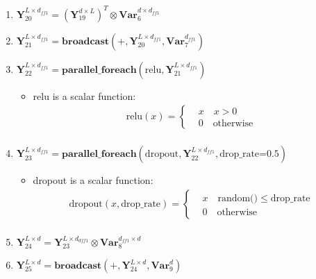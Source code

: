 \begin{enumerate}
  \item $\mathbf{Y}_{20}^{L \times d_{ff1}} = (\mathbf{Y}_{19}^{d \times L})^T \otimes \mathbf{Var}_6^{d \times d_{ff1}}$
  \item $\mathbf{Y}_{21}^{L \times d_{ff1}} = \textbf{broadcast}(+, \mathbf{Y}_{20}^{L \times d_{ff1}}, \mathbf{Var}_{7}^{d_{ff1}})$
  \item $\mathbf{Y}_{22}^{L \times d_{ff1}} = \textbf{parallel\_foreach}(\text{relu}, \mathbf{Y}_{21}^{L \times d_{ff1}})$
  \begin{itemize}
    \item relu is a scalar function:\begin{equation*}
    \begin{aligned}
      \text{relu}(x) = \left\{
      \begin{aligned}
        &x \quad x > 0 \\
        &0 \quad \text{otherwise}
      \end{aligned}
      \right. \\
    \end{aligned}
  \end{equation*}
  \end{itemize}

  \item $\mathbf{Y}_{23}^{L \times d_{ff1}} = \textbf{parallel\_foreach}(\text{dropout}, \mathbf{Y}_{22}^{L \times d_{ff1}},\text{drop\_rate=0.5})$
  \begin{itemize}
    \item dropout is a scalar function:\begin{equation*}
    \begin{aligned}
      \text{dropout}(x, \text{drop\_rate}) = \left\{
      \begin{aligned}
        &x \quad \text{random()} \le \text{drop\_rate} \\
        &0 \quad \text{otherwise}
      \end{aligned}
      \right. \\
    \end{aligned}
  \end{equation*}

  \end{itemize}
  \item $\mathbf{Y}_{24}^{L \times d} = \mathbf{Y}_{23}^{L \times d_{dff1}} \otimes \textbf{Var}_{8}^{d_{ff1} \times d}$
  \item $\mathbf{Y}_{25}^{L \times d} = \textbf{broadcast}(+, \mathbf{Y}_{24}^{L \times d}, \textbf{Var}_{9}^{d})$
\end{enumerate}

